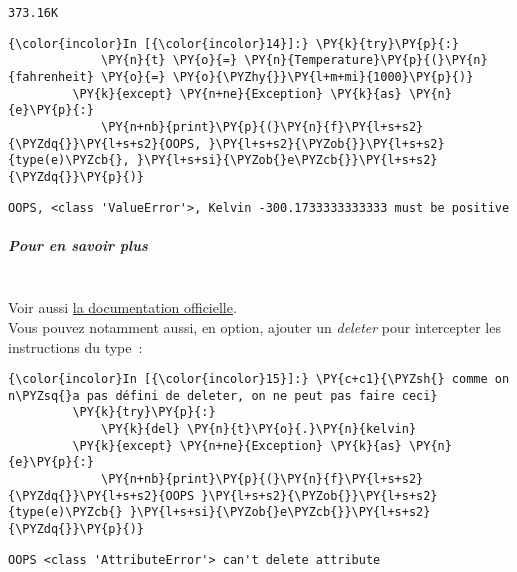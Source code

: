     \begin{Verbatim}[commandchars=\\\{\}]
373.16K

    \end{Verbatim}

    \begin{Verbatim}[commandchars=\\\{\}]
{\color{incolor}In [{\color{incolor}14}]:} \PY{k}{try}\PY{p}{:}
             \PY{n}{t} \PY{o}{=} \PY{n}{Temperature}\PY{p}{(}\PY{n}{fahrenheit} \PY{o}{=} \PY{o}{\PYZhy{}}\PY{l+m+mi}{1000}\PY{p}{)}
         \PY{k}{except} \PY{n+ne}{Exception} \PY{k}{as} \PY{n}{e}\PY{p}{:}
             \PY{n+nb}{print}\PY{p}{(}\PY{n}{f}\PY{l+s+s2}{\PYZdq{}}\PY{l+s+s2}{OOPS, }\PY{l+s+s2}{\PYZob{}}\PY{l+s+s2}{type(e)\PYZcb{}, }\PY{l+s+si}{\PYZob{}e\PYZcb{}}\PY{l+s+s2}{\PYZdq{}}\PY{p}{)}
\end{Verbatim}


    \begin{Verbatim}[commandchars=\\\{\}]
OOPS, <class 'ValueError'>, Kelvin -300.1733333333333 must be positive

    \end{Verbatim}

    \hypertarget{pour-en-savoir-plus}{%
\subparagraph{Pour en savoir plus\\\\}\label{pour-en-savoir-plus}}

    Voir aussi
\href{https://docs.python.org/3.6/library/functions.html\#property}{la
documentation officielle}.\\

    Vous pouvez notamment aussi, en option, ajouter un \emph{deleter} pour
intercepter les instructions du type~:

    \begin{Verbatim}[commandchars=\\\{\}]
{\color{incolor}In [{\color{incolor}15}]:} \PY{c+c1}{\PYZsh{} comme on n\PYZsq{}a pas défini de deleter, on ne peut pas faire ceci}
         \PY{k}{try}\PY{p}{:}
             \PY{k}{del} \PY{n}{t}\PY{o}{.}\PY{n}{kelvin}
         \PY{k}{except} \PY{n+ne}{Exception} \PY{k}{as} \PY{n}{e}\PY{p}{:}
             \PY{n+nb}{print}\PY{p}{(}\PY{n}{f}\PY{l+s+s2}{\PYZdq{}}\PY{l+s+s2}{OOPS }\PY{l+s+s2}{\PYZob{}}\PY{l+s+s2}{type(e)\PYZcb{} }\PY{l+s+si}{\PYZob{}e\PYZcb{}}\PY{l+s+s2}{\PYZdq{}}\PY{p}{)}
\end{Verbatim}


    \begin{Verbatim}[commandchars=\\\{\}]
OOPS <class 'AttributeError'> can't delete attribute

    \end{Verbatim}